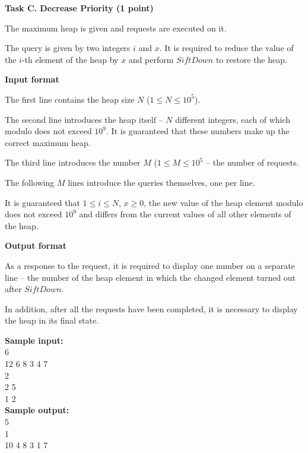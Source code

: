 \documentclass[a4paper]{article}
\begin{document}
\textbf{Task C. Decrease Priority (1 point)}

\SPACE

The maximum heap is given and requests are executed on it.

The query is given by two integers $i$ and $x$. It is required to reduce the value of the $i$-th element of the heap by $x$ and perform $SiftDown$ to restore the heap.

\SPACE

\textbf{Input format}

The first line contains the heap size $N$ ($1 \le N \le 10^5$). 

The second line introduces the heap itself -- $N$ different integers, each of which modulo does not exceed $10^9$. It is guaranteed that these numbers make up the correct maximum heap.

The third line introduces the number $M$ ($1 \le M \le 10^5$ -- the number of requests.

The following $M$ lines introduce the queries themselves, one per line.

It is guaranteed that $1 \le i \le N$, $x \ge 0$, the new value of the heap element modulo does not exceed $10^9$ and differs from the current values of all other elements of the heap.

\SPACE

\textbf{Output format}

As a response to the request, it is required to display one number on a separate line -- the number of the heap element in which the changed element turned out after $SiftDown$.

In addition, after all the requests have been completed, it is necessary to display the heap in its final state.

\SPACE

\noindent \textbf{Sample input:}\\
6\\
12 6 8 3 4 7\\
2\\
2 5\\
1 2\\


\noindent \textbf{Sample output:}\\
5\\
1\\
10 4 8 3 1 7\\
\end{document}
